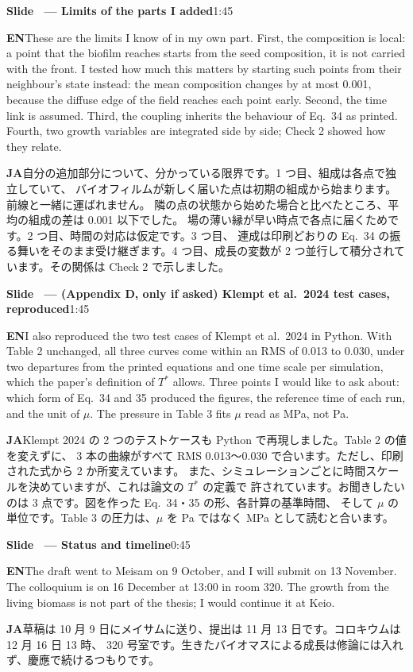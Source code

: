 \documentclass[11pt,a4paper]{article}
\newcounter{sl}
\newcommand{\slide}[2]{\stepcounter{sl}\vspace{8pt}%
  {\color{c3}\large\bfseries Slide \thesl\ --- #1}\hfill{\small #2}\par\vspace{2pt}}
\newcommand{\EN}{\textbf{EN}\quad}
\newcommand{\JA}{\par\textbf{JA}\quad}
\begin{document}
\slide{Limits of the parts I added}{1:45}
\EN These are the limits I know of in my own part. First, the composition
is local: a point that the biofilm reaches starts from the seed composition,
it is not carried with the front. I tested how much this matters by
starting such points from their neighbour's state instead: the mean
composition changes by at most 0.001, because the diffuse edge of the field
reaches each point early. Second, the time link is assumed. Third, the
coupling inherits the behaviour of Eq.\ 34 as printed. Fourth, two growth
variables are integrated side by side; Check 2 showed how they relate.
\JA 自分の追加部分について、分かっている限界です。1 つ目、組成は各点で独立していて、
バイオフィルムが新しく届いた点は初期の組成から始まります。前線と一緒に運ばれません。
隣の点の状態から始めた場合と比べたところ、平均の組成の差は 0.001 以下でした。
場の薄い縁が早い時点で各点に届くためです。2 つ目、時間の対応は仮定です。3 つ目、
連成は印刷どおりの Eq.\ 34 の振る舞いをそのまま受け継ぎます。4 つ目、成長の変数が
2 つ並行して積分されています。その関係は Check 2 で示しました。

\slide{(Appendix D, only if asked) Klempt et al.\ 2024 test cases, reproduced}{1:45}
\EN I also reproduced the two test cases of Klempt et al.\ 2024 in Python.
With Table 2 unchanged, all three curves come within an RMS of 0.013 to 0.030, under
two departures from the printed equations and one time scale per
simulation, which the paper's definition of $T^*$ allows. Three points I
would like to ask about: which form of Eq.\ 34 and 35 produced the figures,
the reference time of each run, and the unit of $\mu$. The pressure in
Table 3 fits $\mu$ read as MPa, not Pa.
\JA Klempt 2024 の 2 つのテストケースも Python で再現しました。Table 2 の値を変えずに、
3 本の曲線がすべて RMS 0.013〜0.030 で合います。ただし、印刷された式から 2 か所変えています。
また、シミュレーションごとに時間スケールを決めていますが、これは論文の $T^*$ の定義で
許されています。お聞きしたいのは 3 点です。図を作った Eq.\ 34・35 の形、各計算の基準時間、
そして $\mu$ の単位です。Table 3 の圧力は、$\mu$ を Pa ではなく MPa として読むと合います。

\slide{Status and timeline}{0:45}
\EN The draft went to Meisam on 9 October, and I will submit on 13 November.
The colloquium is on 16 December at 13:00 in room 320. The growth from the
living biomass is not part of the thesis; I would continue it at Keio.
\JA 草稿は 10 月 9 日にメイサムに送り、提出は 11 月 13 日です。コロキウムは 12 月 16 日 13 時、
320 号室です。生きたバイオマスによる成長は修論には入れず、慶應で続けるつもりです。
\end{document}
